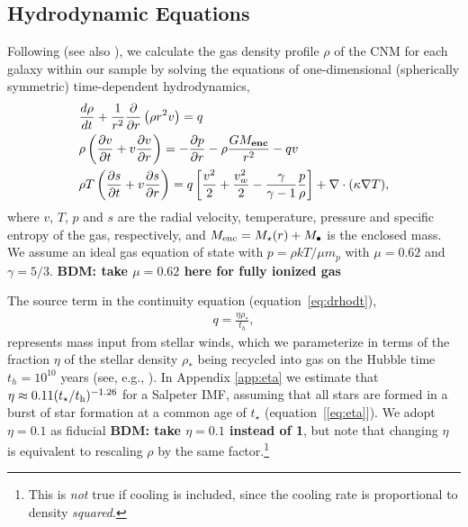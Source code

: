 \documentclass[usenatbib,fleqn]{mn2e}
\newcommand{\dxdy}[2]{\frac{d #1}{d #2} }
\newcommand{\drhodt}{\dxdy{\rho}{t}}
\newcommand{\ke}{\frac{v^2}{2}}
\newcommand{\kew}{\frac{v_w^2}{2}}
\newcommand{\gammaf}{\frac{\gamma}{\gamma-1}}
\newcommand{\cs}{\frac{p}{\rho}}
\newcommand{\rhostar}{\rho_*}
\newcommand{\Mbh}[1][]{M_{\bullet#1}}
\renewcommand{\th}{t_h}
\begin{document}


\subsection{Hydrodynamic Equations}
\label{sec:hydro}

Following \citet{Quataert:2004a} (see also \citealt{HolzerAxford:1970a,De-ColleGuillochon+:2012a,ShcherbakovWong+:2014a}), we calculate the gas density profile $\rho$ of the CNM for each galaxy within our sample by solving the equations of one-dimensional (spherically symmetric) time-dependent hydrodynamics,
\begin{align}
  &\drhodt+\frac{1}{r^2}\frac{\partial}{\partial r}\left(\rho r^2 v\right)=q \label{eq:drhodt}\\
  &\rho \left(\frac{\partial v}{\partial t} + v\frac{\partial
      v}{\partial r}\right) =-\frac{\partial p}{\partial r}- \rho\frac{GM_{\bf enc}}{r^{2}} -q v \label{eq:dvdt}\\
  &\rho T\left(\frac{\partial s}{\partial t} + v\frac{\partial
      s}{\partial r}\right)=q\left[\ke+\kew-\gammaf \cs \right]
  +\nabla\cdot(\kappa \nabla T)
, 
\label{eq:dsdt}
\end{align}
where $v$, $T$, $p$ and $s$ are the radial velocity, temperature,
pressure and specific entropy of the gas, respectively, and $M_{\rm enc} = M_{\star}(r) + \Mbh$ is the
enclosed mass.  We assume an ideal gas equation of state with $p =
\rho kT/\mu m_p$ with $\mu = 0.62$  and $\gamma = 5/3$. {\bf BDM: take $\mu = 0.62$ here for fully ionized gas}

The source term in the continuity equation (equation~\ref{eq:drhodt}),
\begin{align}
  q=\frac{\eta \rhostar}{\th},
\label{eq:q}
\end{align}
represents mass input from stellar winds, which we parameterize in
terms of the fraction $\eta$ of the stellar density $\rhostar$ being
recycled into gas on the Hubble time $\th = 10^{10}$ years (see, e.g.,
\citealt{Ciotti+91}).  In Appendix \ref{app:eta} we estimate that
$\eta \approx 0.11(t_{\star}/t_{\rm h})^{-1.26}$ for a Salpeter IMF,
assuming that all stars are formed in a burst of star formation at a
common age of $t_{\star}$ (equation~[\ref{eq:eta}]).  We adopt
$\eta=0.1$ as fiducial {\bf BDM: take $\eta = 0.1$ instead of 1}, but note that changing $\eta$ is equivalent to
rescaling $\rho$ by the same factor.\footnote{This is {\it not} true
  if cooling is included, since the cooling rate is proportional to
  density {\it squared}.}
\end{document}
